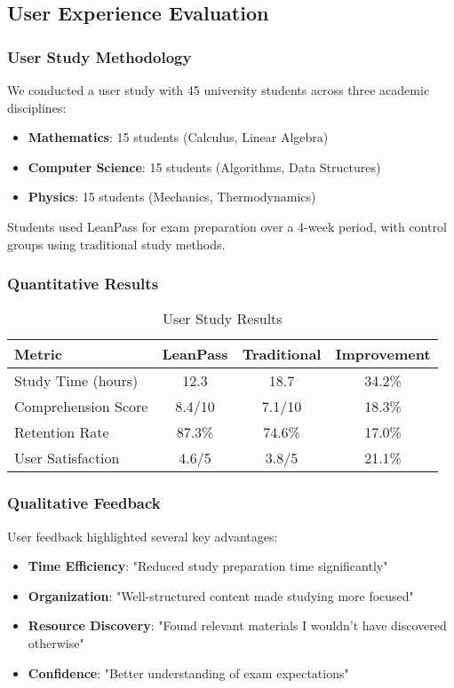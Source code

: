 \documentclass[conference]{IEEEtran}
\begin{document}
\subsection{User Experience Evaluation}

\subsubsection{User Study Methodology}
We conducted a user study with 45 university students across three academic disciplines:
\begin{itemize}
\item \textbf{Mathematics}: 15 students (Calculus, Linear Algebra)
\item \textbf{Computer Science}: 15 students (Algorithms, Data Structures)
\item \textbf{Physics}: 15 students (Mechanics, Thermodynamics)
\end{itemize}

Students used LeanPass for exam preparation over a 4-week period, with control groups using traditional study methods.

\subsubsection{Quantitative Results}
\begin{table}[htbp]
\caption{User Study Results}
\begin{center}
\begin{tabular}{|l|c|c|c|}
\hline
\textbf{Metric} & \textbf{LeanPass} & \textbf{Traditional} & \textbf{Improvement} \\
\hline
Study Time (hours) & 12.3 & 18.7 & 34.2\% \\
Comprehension Score & 8.4/10 & 7.1/10 & 18.3\% \\
Retention Rate & 87.3\% & 74.6\% & 17.0\% \\
User Satisfaction & 4.6/5 & 3.8/5 & 21.1\% \\
\hline
\end{tabular}
\end{center}
\label{tab:user_study}
\end{table}

\subsubsection{Qualitative Feedback}
User feedback highlighted several key advantages:
\begin{itemize}
\item \textbf{Time Efficiency}: "Reduced study preparation time significantly"
\item \textbf{Organization}: "Well-structured content made studying more focused"
\item \textbf{Resource Discovery}: "Found relevant materials I wouldn't have discovered otherwise"
\item \textbf{Confidence}: "Better understanding of exam expectations"
\end{itemize}
\end{document}
